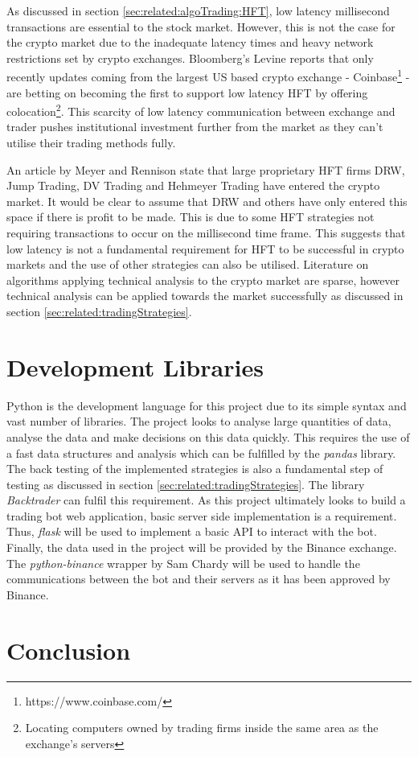 As discussed in section \ref{sec:related:algoTrading:HFT}, low latency millisecond transactions are essential to the stock market. However, this is not the case for the crypto market due to the inadequate latency times and heavy network restrictions set by crypto exchanges. Bloomberg's Levine reports \cite{WEB:Levine:2018} that only recently updates coming from the largest US based crypto exchange - Coinbase\footnote{https://www.coinbase.com/} - are betting on becoming the first to support low latency HFT by offering colocation\footnote{Locating computers owned by trading firms inside the same area as the exchange's servers}. This scarcity of low latency communication between exchange and trader pushes institutional investment further from the market as they can't utilise their trading methods fully.

An article by Meyer and Rennison \cite{ART:Meyer:2017} state that large proprietary HFT firms DRW, Jump Trading, DV Trading and Hehmeyer Trading have entered the crypto market. It would be clear to assume that DRW and others have only entered this space if there is profit to be made. This is due to some HFT strategies not requiring transactions to occur on the millisecond time frame. This suggests that low latency is not a fundamental requirement for HFT to be successful in crypto markets and the use of other strategies can also be utilised. Literature on algorithms applying technical analysis to the crypto market are sparse, however technical analysis can be applied towards the market successfully as discussed in section \ref{sec:related:tradingStrategies}.


\section{Development Libraries}
\label{sec:related:developmentLibraries}

Python is the development language for this project due to its simple syntax and vast number of libraries. The project looks to analyse large quantities of data, analyse the data and make decisions on this data quickly. This requires the use of a fast data structures and analysis which can be fulfilled by the \textit{pandas} \cite{pandas} library. The back testing of the implemented strategies is also a fundamental step of testing as discussed in section \ref{sec:related:tradingStrategies}. The library \textit{Backtrader} \cite{backtrader} can fulfil this requirement. As this project ultimately looks to build a trading bot web application, basic server side implementation is a requirement. Thus, \textit{flask} will be used to implement a basic API to interact with the bot. Finally, the data used in the project will be provided by the Binance exchange. The \textit{python-binance} wrapper by Sam Chardy \cite{chardy} will be used to handle the communications between the bot and their servers as it has been approved by Binance.



\section{Conclusion}
\label{sec:related:conclusion}

